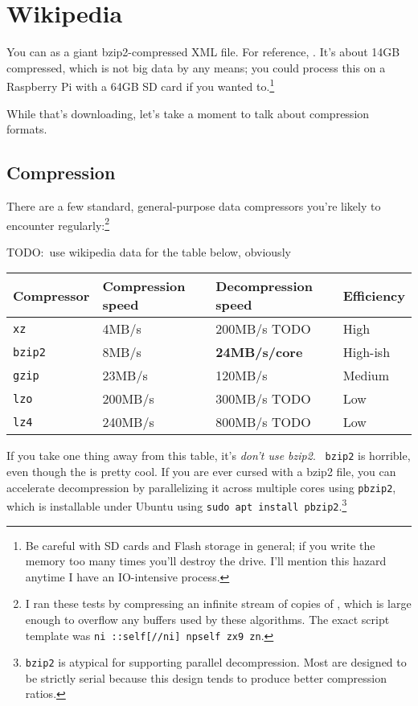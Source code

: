 \section{Wikipedia}
You can
 as a giant bzip2-compressed XML file. For
reference,
. It's about 14GB compressed, which is not
big data by any means; you could process this on a Raspberry Pi with a 64GB SD
card if you wanted to.\footnote{Be careful with SD cards and Flash storage in
general; if you write the memory too many times you'll destroy the drive. I'll
mention this hazard anytime I have an IO-intensive process.}

While that's downloading, let's take a moment to talk about compression formats.

\subsection{Compression}
There are a few standard, general-purpose data compressors you're likely to
encounter regularly:\footnote{I ran these tests by compressing an infinite
stream of copies of , which is large enough to overflow any buffers used by these
algorithms. The exact script template was {\tt ni ::self[//ni] npself zx9 zn}.}

TODO:~use wikipedia data for the table below, obviously

\begin{table}[ht]
\begin{tabular}{llll}
  Compressor  & Compression speed & Decompression speed & Efficiency \\
  \hline
  {\tt xz}    & 4MB/s             & 200MB/s TODO        & High \\
  {\tt bzip2} & 8MB/s             & {\bf 24MB/s/core}   & High-ish \\
  {\tt gzip}  & 23MB/s            & 120MB/s             & Medium \\
  {\tt lzo}   & 200MB/s           & 300MB/s TODO        & Low \\
  {\tt lz4}   & 240MB/s           & 800MB/s TODO        & Low
\end{tabular}
\end{table}

If you take one thing away from this table, it's {\it don't use bzip2}. {\tt
bzip2} is horrible, even though the
is pretty cool. If you are ever cursed with a bzip2 file, you can accelerate
decompression by parallelizing it across multiple cores using {\tt pbzip2},
which is installable under Ubuntu using {\tt sudo apt install
pbzip2}.\footnote{{\tt bzip2} is atypical for supporting parallel decompression.
Most are designed to be strictly serial because this design tends to produce
better compression ratios.}

